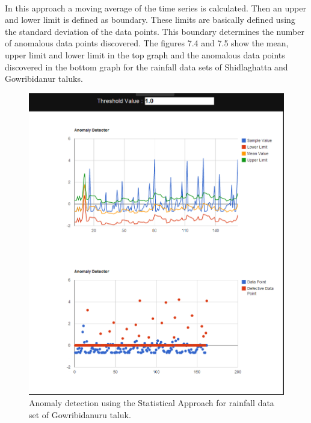 \documentclass[12pt,a4paper]{report}
\begin{document}
\paragraph{} In this approach a moving average of the time series is calculated. Then an upper and lower limit is defined as boundary. These limits are basically defined using the standard deviation of the data points. This boundary determines the number of anomalous data points discovered. The figures 7.4 and 7.5 show the mean, upper limit and lower limit in the top graph and the anomalous data points discovered in the bottom graph for the rainfall data sets of Shidlaghatta and Gowribidanur taluks.
\begin{figure}[h!]

  \centering
    \includegraphics[scale=0.5]{./screenshots/result_ano_stat_Gow.png}
  \caption{Anomaly detection using the Statistical Approach for rainfall data set of Gowribidanuru taluk.}
\end{figure}
\end{document}
